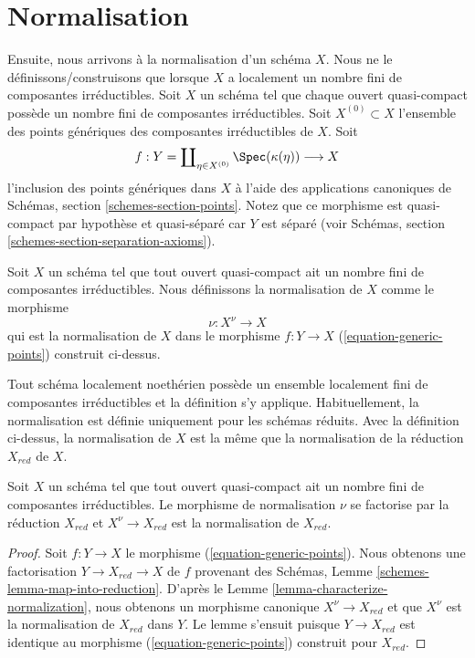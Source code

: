 \section{Normalisation}
\label{section-normalization}

\noindent
Ensuite, nous arrivons à la normalisation d'un schéma $X$.
Nous ne le définissons/construisons que lorsque $X$ a localement un nombre fini de
composantes irréductibles. Soit $X$ un schéma tel que chaque ouvert quasi-compact
possède un nombre fini de composantes irréductibles.
Soit $X^{(0)} \subset X$ l'ensemble des points génériques des composantes irréductibles de $X$.
Soit
\begin{equation}
\label{equation-generic-points}
f :
Y = \coprod\nolimits_{\eta \in X^{(0)}} \Spec(\kappa(\eta))
\longrightarrow
X
\end{equation}
l'inclusion des points génériques dans $X$ à
l'aide des applications canoniques de Schémas, section \ref{schemes-section-points}.
Notez que ce morphisme est quasi-compact par
hypothèse et quasi-séparé car $Y$
est séparé (voir Schémas, section \ref{schemes-section-separation-axioms}).

\begin{definition}
\label{definition-normalization}
Soit $X$ un schéma tel que tout ouvert quasi-compact ait un nombre fini de
composantes irréductibles. Nous définissons la normalisation {\it
} de $X$ comme le morphisme
$$
\nu : X^\nu \longrightarrow X
$$
qui est la normalisation de $X$ dans le morphisme
$f : Y \to X$ (\ref{equation-generic-points}) construit ci-dessus.
\end{definition}

\noindent
Tout schéma localement noethérien possède un ensemble localement fini de composantes
irréductibles et la définition s'y applique. Habituellement,
la normalisation est définie uniquement pour les schémas réduits.
Avec la définition ci-dessus, la normalisation de $X$ est la même
que la normalisation de la réduction $X_{red}$ de $X$.

\begin{lemma}
\label{lemma-normalization-reduced}
Soit $X$ un schéma tel que tout ouvert quasi-compact ait
un nombre fini de composantes irréductibles. Le morphisme de normalisation
$\nu$ se factorise par la réduction $X_{red}$ et $X^\nu \to X_{red}$
est la normalisation de $X_{red}$.
\end{lemma}

\begin{proof}
Soit $f : Y \to X$ le morphisme (\ref{equation-generic-points}). Nous obtenons
une factorisation $Y \to X_{red} \to X$ de $f$ provenant
des Schémas, Lemme \ref{schemes-lemma-map-into-reduction}. D'après le
Lemme \ref{lemma-characterize-normalization}, nous obtenons un morphisme canonique $X^\nu \to X_{red}$
et que $X^\nu$
est la normalisation de $X_{red}$ dans $Y$.
Le lemme s'ensuit puisque $Y \to X_{red}$ est identique au
morphisme (\ref{equation-generic-points}) construit pour $X_{red}$.
\end{proof}

